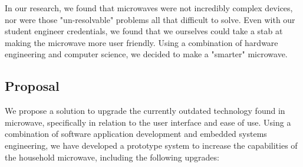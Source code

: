 \documentclass[10pt,journal,letterpaper,twocolumn]{IEEEtran}
\begin{document}
In our research, we found that microwaves were not incredibly complex devices, nor were those "un-resolvable" problems all that difficult to solve.  Even with our student engineer credentials, we found that we ourselves could take a stab at making the microwave more user friendly.  Using a combination of hardware engineering and computer science, we decided to make a "smarter" microwave.

\subsection{Proposal}
We propose a solution to upgrade the currently outdated technology found in microwave, specifically in relation to the user interface and ease of use.  Using a combination of software application development and embedded systems engineering, we have developed a prototype system to increase the capabilities of the household microwave, including the following upgrades:
\end{document}
